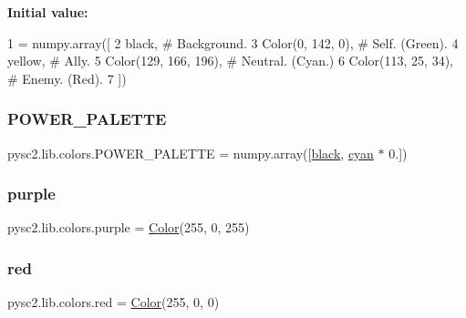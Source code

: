 {\bfseries Initial value\+:}
\begin{DoxyCode}
1 =  numpy.array([
2     black,                 \textcolor{comment}{# Background.}
3     Color(0, 142, 0),      \textcolor{comment}{# Self. (Green).}
4     yellow,                \textcolor{comment}{# Ally.}
5     Color(129, 166, 196),  \textcolor{comment}{# Neutral. (Cyan.)}
6     Color(113, 25, 34),    \textcolor{comment}{# Enemy. (Red).}
7 ])
\end{DoxyCode}
\mbox{\label{namespacepysc2_1_1lib_1_1colors_ae0244020a31c05a609bdc2bff344eaf5}} 
\subsubsection{\texorpdfstring{P\+O\+W\+E\+R\+\_\+\+P\+A\+L\+E\+T\+TE}{POWER\_PALETTE}}
{\footnotesize\ttfamily pysc2.\+lib.\+colors.\+P\+O\+W\+E\+R\+\_\+\+P\+A\+L\+E\+T\+TE = numpy.\+array(\mbox{[}\mbox{\hyperlink{namespacepysc2_1_1lib_1_1colors_a37add41a750e4e281c149ca0b1e26171}{black}}, \mbox{\hyperlink{namespacepysc2_1_1lib_1_1colors_a617105e0d36f090c7b3746655fcf904e}{cyan}} $\ast$ 0.\mbox{]})}

\mbox{\label{namespacepysc2_1_1lib_1_1colors_a6945028eea5ce10d8f5b215c20562eb2}} 
\subsubsection{\texorpdfstring{purple}{purple}}
{\footnotesize\ttfamily pysc2.\+lib.\+colors.\+purple = \mbox{\hyperlink{classpysc2_1_1lib_1_1colors_1_1_color}{Color}}(255, 0, 255)}

\mbox{\label{namespacepysc2_1_1lib_1_1colors_acd944331427c35a1b9a0031140af69d1}} 
\subsubsection{\texorpdfstring{red}{red}}
{\footnotesize\ttfamily pysc2.\+lib.\+colors.\+red = \mbox{\hyperlink{classpysc2_1_1lib_1_1colors_1_1_color}{Color}}(255, 0, 0)}

